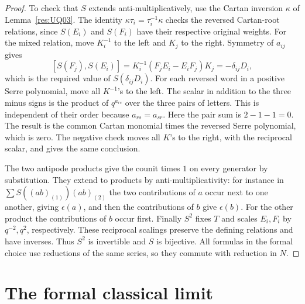 \documentclass[11pt,oneside,openany]{book}
\theoremstyle{definition}
\theoremstyle{remark}
\begin{document}
\begin{proof}
To check that \(S\) extends anti-multiplicatively, use the
Cartan inversion \(\kappa\) of Lemma~\ref{res:UQ03}.
The identity \(\kappa\tau_i=\tau_i^{-1}\kappa\) checks
the reversed Cartan-root relations, since \(S(E_i)\)
and \(S(F_i)\) have their respective original weights.
For the mixed relation, move \(K_i^{-1}\) to the left
and \(K_j\) to the right. Symmetry of \(a_{ij}\) gives
\[
 [S(F_j),S(E_i)]
    =K_i^{-1}(F_jE_i-E_iF_j)K_j=-\delta_{ij}D_i,
\]
which is the required value of \(S(\delta_{ij}D_i)\).
For each reversed word in a positive Serre polynomial,
move all \(K^{-1}\)'s to the left. The scalar in addition
to the three minus signs is the product of \(q^{a_{rs}}\)
over the three pairs of letters. This is independent of
their order because \(a_{rs}=a_{sr}\). Here the pair sum
is \(2-1-1=0\). The result is the common Cartan monomial
times the reversed Serre polynomial, which is zero.
The negative check moves all \(K\)'s to the right,
with the reciprocal scalar, and gives the same conclusion.

The two antipode products give the counit times \(1\)
on every generator by substitution. They extend to products
by anti-multiplicativity: for instance in
\(\sum S((ab)_{(1)})(ab)_{(2)}\) the two contributions of
\(a\) occur next to one another, giving \(\epsilon(a)\),
and then the contributions of \(b\) give \(\epsilon(b)\).
For the other product the contributions of \(b\) occur
first. Finally \(S^2\) fixes \(T\) and scales \(E_i,F_i\)
by \(q^{-2},q^2\), respectively. These reciprocal scalings
preserve the defining relations and have inverses.
Thus \(S^2\) is invertible and \(S\) is bijective.
All formulas in the formal choice use reductions of the
same series, so they commute with reduction in \(N\).
\end{proof}

\section{The formal classical limit}
\end{document}

